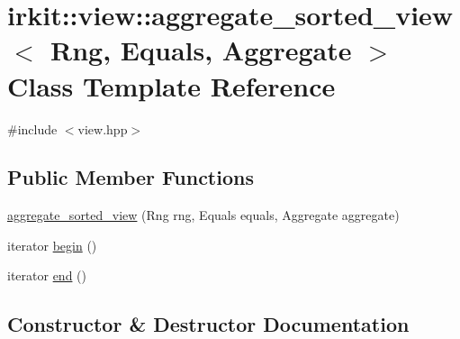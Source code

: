 \hypertarget{classirkit_1_1view_1_1aggregate__sorted__view}{}\section{irkit\+:\+:view\+:\+:aggregate\+\_\+sorted\+\_\+view$<$ Rng, Equals, Aggregate $>$ Class Template Reference}
\label{classirkit_1_1view_1_1aggregate__sorted__view}


{\ttfamily \#include $<$view.\+hpp$>$}

\subsection*{Public Member Functions}
\begin{DoxyCompactItemize}
\item 
\hyperlink{classirkit_1_1view_1_1aggregate__sorted__view_ac4bb5feea5faf3bc58d662bd5c8d4de5}{aggregate\+\_\+sorted\+\_\+view} (Rng rng, Equals equals, Aggregate aggregate)
\item 
iterator \hyperlink{classirkit_1_1view_1_1aggregate__sorted__view_a6e45f5ee40da2b8f4fed52e0b8fec8de}{begin} ()
\item 
iterator \hyperlink{classirkit_1_1view_1_1aggregate__sorted__view_ae49c7357a20d9b26eec64f28c2834585}{end} ()
\end{DoxyCompactItemize}


\subsection{Constructor \& Destructor Documentation}
\mbox{\label{classirkit_1_1view_1_1aggregate__sorted__view_ac4bb5feea5faf3bc58d662bd5c8d4de5}} 
